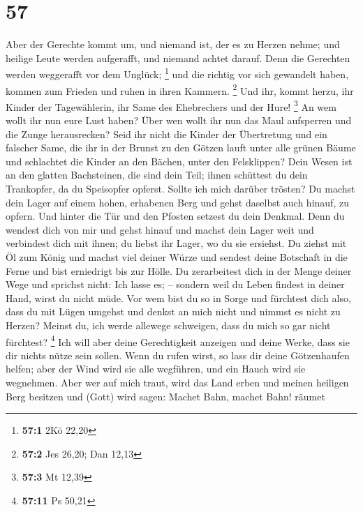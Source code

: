 \hypertarget{section-21}{%
\section{57}\label{section-21}}

 Aber der Gerechte kommt um, und niemand ist, der es zu
Herzen nehme; und heilige Leute werden aufgerafft, und niemand achtet
darauf. Denn die Gerechten werden weggerafft vor dem Unglück;
\footnote{\textbf{57:1} 2Kö 22,20}  und die richtig vor
sich gewandelt haben, kommen zum Frieden und ruhen in ihren Kammern.
\footnote{\textbf{57:2} Jes 26,20; Dan 12,13}  Und ihr,
kommt herzu, ihr Kinder der Tagewählerin, ihr Same des Ehebrechers und
der Hure! \footnote{\textbf{57:3} Mt 12,39}  An wem wollt
ihr nun eure Lust haben? Über wen wollt ihr nun das Maul aufsperren und
die Zunge herausrecken? Seid ihr nicht die Kinder der Übertretung und
ein falscher Same,  die ihr in der Brunst zu den Götzen
lauft unter alle grünen Bäume und schlachtet die Kinder an den Bächen,
unter den Felsklippen?  Dein Wesen ist an den glatten
Bachsteinen, die sind dein Teil; ihnen schüttest du dein Trankopfer, da
du Speisopfer opferst. Sollte ich mich darüber trösten? 
Du machst dein Lager auf einem hohen, erhabenen Berg und gehst daselbst
auch hinauf, zu opfern.  Und hinter die Tür und den
Pfosten setzest du dein Denkmal. Denn du wendest dich von mir und gehst
hinauf und machst dein Lager weit und verbindest dich mit ihnen; du
liebst ihr Lager, wo du sie ersiehst.  Du ziehst mit Öl
zum König und machst viel deiner Würze und sendest deine Botschaft in
die Ferne und bist erniedrigt bis zur Hölle.  Du
zerarbeitest dich in der Menge deiner Wege und sprichst nicht: Ich lasse
es; -- sondern weil du Leben findest in deiner Hand, wirst du nicht
müde.  Vor wem bist du so in Sorge und fürchtest dich
also, dass du mit Lügen umgehst und denkst an mich nicht und nimmst es
nicht zu Herzen? Meinst du, ich werde allewege schweigen, dass du mich
so gar nicht fürchtest? \footnote{\textbf{57:11} Ps 50,21}
 Ich will aber deine Gerechtigkeit anzeigen und deine
Werke, dass sie dir nichts nütze sein sollen.  Wenn du
rufen wirst, so lass dir deine Götzenhaufen helfen; aber der Wind wird
sie alle wegführen, und ein Hauch wird sie wegnehmen. Aber wer auf mich
traut, wird das Land erben und meinen heiligen Berg besitzen
 und (Gott) wird sagen: Machet Bahn, machet Bahn! räumet
